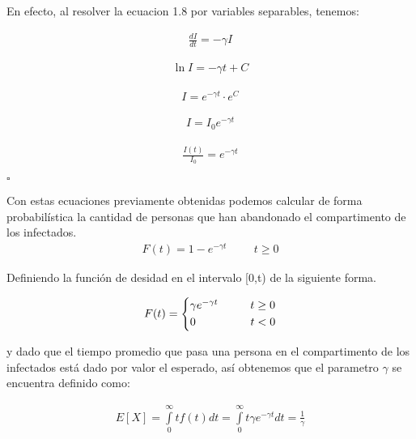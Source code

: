 \begin{Dem}
En efecto, al resolver la ecuacion 1.8 por variables separables, tenemos: 

\begin{align*}
\frac{dI}{dt} = - \gamma I
\end{align*}

\begin{align*}
\ln{I} = - \gamma t + C
\end{align*}

\begin{align*}
I = e^{- \gamma t} \cdot e^{C}
\end{align*}

\begin{align*}
I = I_{0} e^{- \gamma t}
\end{align*}

\begin{align*}
\frac{I(t)}{I_{0}} = e^{-\gamma t}
\end{align*}

\hfill	$\square$

\end{Dem}

Con estas ecuaciones previamente obtenidas podemos calcular de forma probabilística la cantidad de personas que han abandonado el compartimento de los infectados.
\begin{align}
F(t) = 1 -  e^{-\gamma t} \hspace{1cm} t \geq  0
\end{align}

Definiendo la función de desidad en el intervalo [0,t) de la siguiente forma.

\begin{equation*}
F(t) =
\begin{cases*}
\gamma e^{-\gamma t} \hspace{1cm} t \geq  0 \\
0 \hspace{1.7cm} t <  0
\end{cases*}
\end{equation*}

y dado que el tiempo promedio que pasa una persona en el compartimento de los infectados está dado por valor el esperado, así obtenemos que el parametro $\gamma$ se encuentra definido como:

\begin{align}
E[X] = \int \limits_{0}^{\infty} tf(t)dt = \int \limits_{0}^{\infty} t\gamma e^{-\gamma t} dt = \frac{1}{\gamma}
\end{align}

